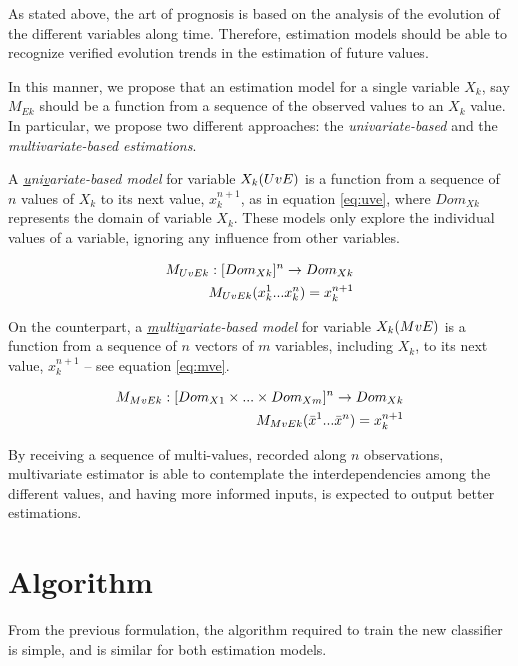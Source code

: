 As stated above, the art of prognosis is based on the analysis of the evolution of the different variables along time. Therefore,
 estimation models should be able to recognize verified evolution trends in the estimation of future values. 

In this manner, we propose that an estimation model for a single variable $X_k$, say $M_{Ek}$ should be a function from a sequence of the
 observed values to an $X_k$ value. In particular, we propose two different approaches: the \emph{univariate-based} and 
 the \emph{multivariate-based estimations}.

A \emph{\underline{u}ni\underline{v}ariate-based model} for variable $X_k\space(UvE)$ is a function from a sequence of $n$
 values of $X_k$ to its next value, $x_k^{n+1}$, as
 in equation \ref{eq:uve}, where $Dom_{Xk}$ represents the domain of variable $X_k$. These models only explore the individual values of a 
 variable, ignoring any influence from other variables.
 
\begin{eqnarray}
	M_{UvEk}:[Dom_{Xk}]^n \rightarrow Dom_{Xk}        \\ \label{eq:uve}
	M_{UvEk}(x_k^1 \space...\space x_k^n) = x_k^{n+1} \nonumber
\end{eqnarray}

On the counterpart, a \emph{\underline{m}ulti\underline{v}ariate-based model} for variable $X_k \space (MvE)$ is a function from a sequence 
of $n$ vectors of $m$ variables, including $X_k$, to its next value, $x_k^{n+1}$ – see equation \ref{eq:mve}.

\begin{eqnarray}
	M_{MvEk}:[Dom_{X1} \times ... \times Dom_{Xm}]^n \rightarrow Dom_{Xk}  \\ \label{eq:mve}
	M_{MvEk}(\bar{x}^1 \space...\space \bar{x}^n) = x_k^{n+1} \nonumber
\end{eqnarray}

By receiving a sequence of multi-values, recorded along $n$ observations, multivariate estimator is able to contemplate the interdependencies
 among the different values, and having more informed inputs, is expected to output better estimations.
 
 \section{Algorithm}
 \label{section:algorithm}
 
  From the previous formulation, the algorithm required to train the new classifier is simple, and is similar for both estimation models.
 
